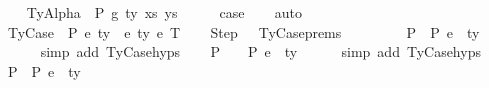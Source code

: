 \begin{isabellebody}
\isamarkupfalse%
\isanewline
\ \ \isamarkupfalse%
\ {\isacharparenleft}{\kern0pt}TyAlpha\ {\isasymGamma}{}\ P\ g\ ty\ xs\ ys{\isacharparenright}{\kern0pt}\isanewline
\ \ \isamarkupfalse%
\ \isamarkupfalse%
\ {\isacharquery}{\kern0pt}case\isanewline
\ \ \isamarkupfalse%
\ auto\isanewline
\ \ \isamarkupfalse%
\isanewline
{}\isamarkupfalse%
\isanewline
\ \ \isamarkupfalse%
\ {\isacharparenleft}{\kern0pt}TyCase\ {\isasymGamma}\ P\ e{}{\isacharprime}{\kern0pt}\ ty{}{\isacharprime}{\kern0pt}\ {\isasymGamma}{}{\isacharprime}{\kern0pt}\ e{}{\isacharprime}{\kern0pt}\ ty{}{\isacharprime}{\kern0pt}\ e{}{\isacharprime}{\kern0pt}\ T{\isacharparenright}{\kern0pt}\isanewline
\isanewline
\ \ \isamarkupfalse%
\ Step\ \ {\isacharequal}{\kern0pt}\ TyCase{\isachardot}{\kern0pt}prems\ \ \ \ \ \isanewline
\isanewline
\ \ \isamarkupfalse%
\ P{}{\isacharcolon}{\kern0pt}\ {\isachardoublequoteopen}{\isasymGamma}\ {\isasymturnstile}{\isacharbraceleft}{\kern0pt}P{\isacharbraceright}{\kern0pt}\ e{}{\isacharprime}{\kern0pt}\ {\isacharcolon}{\kern0pt}\ ty{}{\isacharprime}{\kern0pt}{\isachardoublequoteclose}\isanewline
\ \ \ \ \isamarkupfalse%
\ {\isacharparenleft}{\kern0pt}simp\ add{\isacharcolon}{\kern0pt}\ TyCase{\isachardot}{\kern0pt}hyps{\isacharparenleft}{\kern0pt}{}{\isacharparenright}{\kern0pt}{\isacharparenright}{\kern0pt}\isanewline
\ \ \isamarkupfalse%
\ P{}{\isacharcolon}{\kern0pt}\ {\isachardoublequoteopen}{\isasymGamma}{}{\isacharprime}{\kern0pt}\ {\isacharat}{\kern0pt}\ {\isasymGamma}\ {\isasymturnstile}{\isacharbraceleft}{\kern0pt}P{\isacharbraceright}{\kern0pt}\ e{}{\isacharprime}{\kern0pt}\ {\isacharcolon}{\kern0pt}\ ty{}{\isacharprime}{\kern0pt}{\isachardoublequoteclose}\isanewline
\ \ \ \ \isamarkupfalse%
\ {\isacharparenleft}{\kern0pt}simp\ add{\isacharcolon}{\kern0pt}\ TyCase{\isachardot}{\kern0pt}hyps{\isacharparenleft}{\kern0pt}{}{\isacharparenright}{\kern0pt}{\isacharparenright}{\kern0pt}\isanewline
\ \ \isamarkupfalse%
\ P{}{\isacharcolon}{\kern0pt}\ {\isachardoublequoteopen}{\isasymGamma}\ {\isasymturnstile}{\isacharbraceleft}{\kern0pt}P{\isacharbraceright}{\kern0pt}\ e{}{\isacharprime}{\kern0pt}\ {\isacharcolon}{\kern0pt}\ ty{}{\isacharprime}{\kern0pt}{\isachardoublequoteclose}\isanewline

\end{isabellebody}
